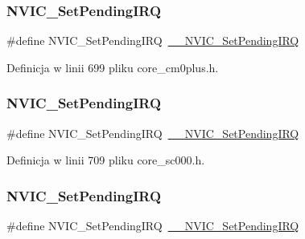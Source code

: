 \subsubsection{\texorpdfstring{N\+V\+I\+C\+\_\+\+Set\+Pending\+I\+RQ}{NVIC\_SetPendingIRQ}\hspace{0.1cm}{\footnotesize\ttfamily [3/12]}}
{\footnotesize\ttfamily \#define N\+V\+I\+C\+\_\+\+Set\+Pending\+I\+RQ~\hyperlink{group___c_m_s_i_s___core___n_v_i_c_functions_gaabefdd4b790b9a7308929938c0c1e1ad}{\+\_\+\+\_\+\+N\+V\+I\+C\+\_\+\+Set\+Pending\+I\+RQ}}



Definicja w linii 699 pliku core\+\_\+cm0plus.\+h.

\mbox{\label{group___c_m_s_i_s___core___n_v_i_c_functions_ga2b47e2e52cf5c48a5c3348636434b3ac}} 
\subsubsection{\texorpdfstring{N\+V\+I\+C\+\_\+\+Set\+Pending\+I\+RQ}{NVIC\_SetPendingIRQ}\hspace{0.1cm}{\footnotesize\ttfamily [4/12]}}
{\footnotesize\ttfamily \#define N\+V\+I\+C\+\_\+\+Set\+Pending\+I\+RQ~\hyperlink{group___c_m_s_i_s___core___n_v_i_c_functions_gaabefdd4b790b9a7308929938c0c1e1ad}{\+\_\+\+\_\+\+N\+V\+I\+C\+\_\+\+Set\+Pending\+I\+RQ}}



Definicja w linii 709 pliku core\+\_\+sc000.\+h.

\mbox{\label{group___c_m_s_i_s___core___n_v_i_c_functions_ga2b47e2e52cf5c48a5c3348636434b3ac}} 
\subsubsection{\texorpdfstring{N\+V\+I\+C\+\_\+\+Set\+Pending\+I\+RQ}{NVIC\_SetPendingIRQ}\hspace{0.1cm}{\footnotesize\ttfamily [5/12]}}
{\footnotesize\ttfamily \#define N\+V\+I\+C\+\_\+\+Set\+Pending\+I\+RQ~\hyperlink{group___c_m_s_i_s___core___n_v_i_c_functions_gaabefdd4b790b9a7308929938c0c1e1ad}{\+\_\+\+\_\+\+N\+V\+I\+C\+\_\+\+Set\+Pending\+I\+RQ}}




